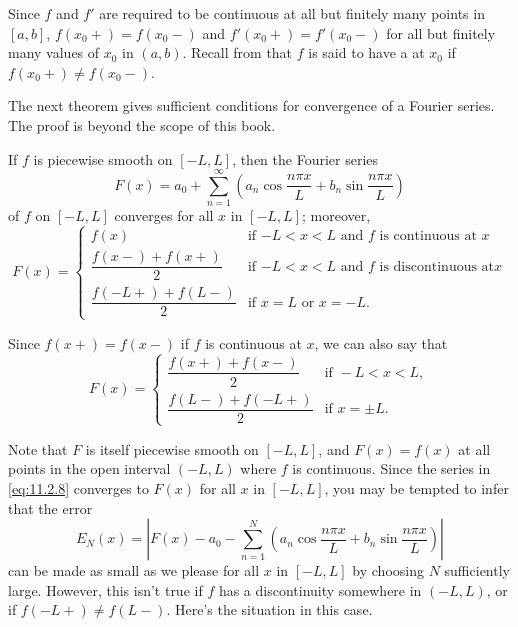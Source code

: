 Since $f$ and $f'$ are required to be continuous at all but
finitely many points in $[a,b]$,
 $f(x_0+)=f(x_0-)$
and $f'(x_0+)=f'(x_0-)$ for all but finitely many
values of $x_0$ in $(a,b)$. Recall from  that
$f$ is said to have a  at $x_0$
if $f(x_0+)\ne f(x_0-)$.

The next theorem gives sufficient conditions for convergence of a
Fourier series. The  proof is beyond the scope of this book.


\begin{theorem}\label{thmtype:11.2.4}
If $f$ is piecewise smooth on $[-L,L]$, then the Fourier series
\begin{equation} \label{eq:11.2.8}
F(x)=a_0+\sum_{n=1}^\infty\left(a_n\cos\frac{n\pi x}{L}+b_n\sin\frac{n\pi
x}{L}\right)
\end{equation}
of $f$
on $[-L,L]$ converges for all $x$ in $[-L,L]$; moreover,
\[
F(x)=
\begin{cases}
f(x)&\text{if $-L<x<L$ and $f$ is continuous at $x$}\\
\dfrac{f(x-)+f(x+)}{2}&\text{if $-L<x<L$ and $f$ is discontinuous at
$x$}\\
\dfrac{f(-L+)+f(L-)}{2}&\text{if $x=L$ or $x=-L$.}
\end{cases}
\]
\end{theorem}


Since $f(x+)=f(x-)$ if $f$ is continuous at $x$, we can also say that
\[
F(x)=
\begin{cases}
\dfrac{f(x+)+f(x-)}{2}&\text{if }-L<x<L,\\
\dfrac{f(L-)+f(-L+)}{2}&\text{if }x=\pm L.
\end{cases}
\]



Note that $F$ is itself  piecewise smooth on $[-L,L]$, and
 $F(x)=f(x)$ at all points in  the open interval
$(-L,L)$ where $f$ is continuous.
 Since the series in \eqref{eq:11.2.8}
converges to $F(x)$ for all $x$ in $[-L,L]$, you may be tempted to
infer
 that the error
\[
E_N(x)=
\left|F(x)-a_0-\sum_{n=1}^N\left(a_n\cos\frac{n\pi x}{L}+b_n\sin\frac{n\pi
x}{L}\right)\right|
\]
can be made as small as we please  for all $x$ in $[-L,L]$
by choosing $N$ sufficiently large. However, this isn't  true if
$f$ has a  discontinuity  somewhere in $(-L,L)$, or if $f(-L+)\ne
f(L-)$.  Here's  the situation in this case.

